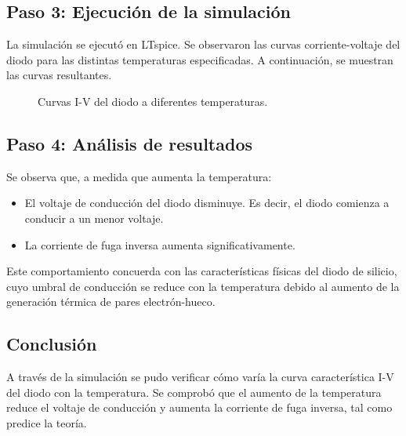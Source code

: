 \subsection{Paso 3: Ejecución de la simulación}

La simulación se ejecutó en LTspice. Se observaron las curvas corriente-voltaje del diodo para las distintas temperaturas especificadas. A continuación, se muestran las curvas resultantes.

\begin{figure}[H]
    \centering
    \caption{Curvas I-V del diodo a diferentes temperaturas.}
\end{figure}

\subsection{Paso 4: Análisis de resultados}

Se observa que, a medida que aumenta la temperatura:
\begin{itemize}
    \item El voltaje de conducción del diodo disminuye. Es decir, el diodo comienza a conducir a un menor voltaje.
    \item La corriente de fuga inversa aumenta significativamente.
\end{itemize}

Este comportamiento concuerda con las características físicas del diodo de silicio, cuyo umbral de conducción se reduce con la temperatura debido al aumento de la generación térmica de pares electrón-hueco.

\subsection*{Conclusión}
A través de la simulación se pudo verificar cómo varía la curva característica I-V del diodo con la temperatura. Se comprobó que el aumento de la temperatura reduce el voltaje de conducción y aumenta la corriente de fuga inversa, tal como predice la teoría.